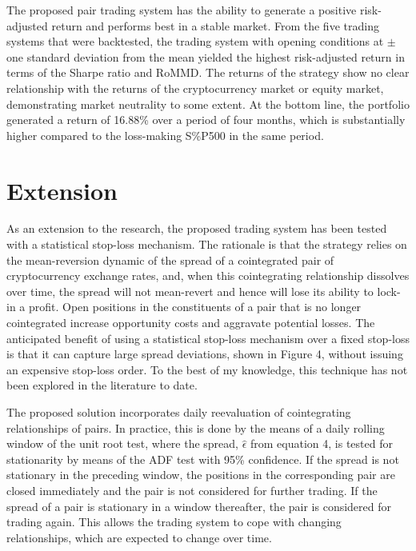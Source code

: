 \documentclass[12pt,english,authoryear]{article}
\begin{document}
The proposed pair trading system has the ability to generate a positive risk-adjusted return and performs best in a stable market. From the five trading systems that were backtested, the trading system with opening conditions at $\pm$ one standard deviation from the mean yielded the highest risk-adjusted return in terms of the Sharpe ratio and RoMMD. The returns of the strategy show no clear relationship with the returns of the cryptocurrency market or equity market, demonstrating market neutrality to some extent. At the bottom line, the portfolio generated a return of 16.88\% over a period of four months, which is substantially higher compared to the loss-making S\%P500 in the same period.

\section{Extension} \label{sec:Extension}

As an extension to the research, the proposed trading system has been tested with a statistical stop-loss mechanism. The rationale is that the strategy relies on the mean-reversion dynamic of the spread of a cointegrated pair of cryptocurrency exchange rates, and, when this cointegrating relationship dissolves over time, the spread will not mean-revert and hence will lose its ability to lock-in a profit. Open positions in the constituents of a pair that is no longer cointegrated increase opportunity costs and aggravate potential losses. The anticipated benefit of using a statistical stop-loss mechanism over a fixed stop-loss is that it can capture large spread deviations, shown in Figure 4, without issuing an expensive stop-loss order. To the best of my knowledge, this technique has not been explored in the literature to date. 

The proposed solution incorporates daily reevaluation of cointegrating relationships of pairs. In practice, this is done by the means of a daily rolling window of the unit root test, where the spread, $\hat{\epsilon}$ from equation 4, is tested for stationarity by means of the ADF test with 95\% confidence. If the spread is not stationary in the preceding window, the positions in the corresponding pair are closed immediately and the pair is not considered for further trading. If the spread of a pair is stationary in a window thereafter, the pair is considered for trading again. This allows the trading system to cope with changing relationships, which are expected to change over time.
\end{document}
